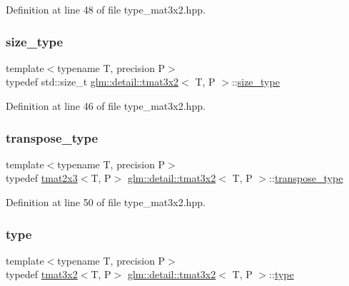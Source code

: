 Definition at line 48 of file type\+\_\+mat3x2.\+hpp.

\mbox{\label{structglm_1_1detail_1_1tmat3x2_af70231300959702a284387cd047e5802}} 
\subsubsection{\texorpdfstring{size\+\_\+type}{size\_type}}
{\footnotesize\ttfamily template$<$typename T, precision P$>$ \\
typedef std\+::size\+\_\+t \hyperlink{structglm_1_1detail_1_1tmat3x2}{glm\+::detail\+::tmat3x2}$<$ T, P $>$\+::\hyperlink{structglm_1_1detail_1_1tmat3x2_af70231300959702a284387cd047e5802}{size\+\_\+type}}



Definition at line 46 of file type\+\_\+mat3x2.\+hpp.

\mbox{\label{structglm_1_1detail_1_1tmat3x2_acb1e7f53f46b54ebb6699582fa1c4b71}} 
\subsubsection{\texorpdfstring{transpose\+\_\+type}{transpose\_type}}
{\footnotesize\ttfamily template$<$typename T, precision P$>$ \\
typedef \hyperlink{structglm_1_1detail_1_1tmat2x3}{tmat2x3}$<$T, P$>$ \hyperlink{structglm_1_1detail_1_1tmat3x2}{glm\+::detail\+::tmat3x2}$<$ T, P $>$\+::\hyperlink{structglm_1_1detail_1_1tmat3x2_acb1e7f53f46b54ebb6699582fa1c4b71}{transpose\+\_\+type}}



Definition at line 50 of file type\+\_\+mat3x2.\+hpp.

\mbox{\label{structglm_1_1detail_1_1tmat3x2_ae5d42d3fe65b97066f5a74e2da7015e3}} 
\subsubsection{\texorpdfstring{type}{type}}
{\footnotesize\ttfamily template$<$typename T, precision P$>$ \\
typedef \hyperlink{structglm_1_1detail_1_1tmat3x2}{tmat3x2}$<$T, P$>$ \hyperlink{structglm_1_1detail_1_1tmat3x2}{glm\+::detail\+::tmat3x2}$<$ T, P $>$\+::\hyperlink{structglm_1_1detail_1_1tmat3x2_ae5d42d3fe65b97066f5a74e2da7015e3}{type}}



